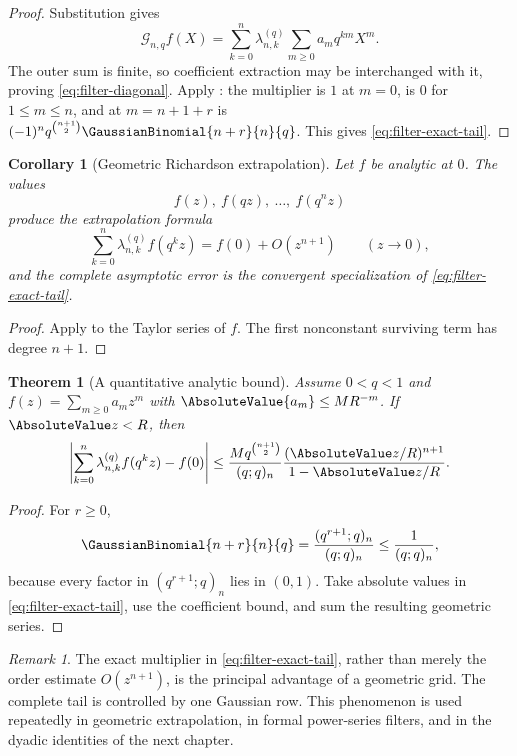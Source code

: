 \documentclass[11pt,a4paper,oneside,openany]{book}
\newtheorem{theorem}{Theorem}[chapter]
\newtheorem{corollary}[corollary]{Corollary}
\theoremstyle{definition}
\theoremstyle{remark}
\newtheorem{remark}[remark]{Remark}
\begin{document}
\begin{proof}
Substitution gives
\[
 \mathcal G_{n,q}f(X)
 =\sum_{k=0}^{n}\lambda_{n,k}^{(q)}
   \sum_{m\ge0}a_mq^{km}X^m.
\]
The outer sum is finite, so coefficient extraction may be interchanged with it, proving \eqref{eq:filter-diagonal}.  Apply : the multiplier is $1$ at $m=0$, is $0$ for $1\le m\le n$, and at $m=n+1+r$ is
$(-1)^nq^{\binom{n+1}{2}}\GaussianBinomial{n+r}{n}{q}$.  This gives \eqref{eq:filter-exact-tail}.
\end{proof}

\begin{corollary}[Geometric Richardson extrapolation]\label{cor:geometric-richardson}
Let $f$ be analytic at $0$.  The values
\[
 f(z),\ f(qz),\ \ldots,\ f(q^nz)
\]
produce the extrapolation formula
\[
 \sum_{k=0}^{n}\lambda_{n,k}^{(q)}f(q^kz)
 =f(0)+O(z^{n+1})
 \qquad(z\to0),
\]
and the complete asymptotic error is the convergent specialization of
\eqref{eq:filter-exact-tail}.
\end{corollary}

\begin{proof}
Apply  to the Taylor series of $f$.  The first nonconstant surviving term has degree $n+1$.
\end{proof}

\begin{theorem}[A quantitative analytic bound]\label{thm:geometric-filter-bound}
Assume $0<q<1$ and
$f(z)=\sum_{m\ge0}a_mz^m$ with
$\AbsoluteValue{a_m}\le M R^{-m}$.  If $\AbsoluteValue z<R$, then
\begin{equation}\label{eq:geometric-filter-bound}
 \left|\sum_{k=0}^{n}\lambda_{n,k}^{(q)}f(q^kz)-f(0)\right|
 \le
 \frac{M q^{\binom{n+1}{2}}}{(q;q)_n}
 \frac{(\AbsoluteValue z/R)^{n+1}}{1-\AbsoluteValue z/R}.
\end{equation}
\end{theorem}

\begin{proof}
For $r\ge0$,
\[
 \GaussianBinomial{n+r}{n}{q}
 =\frac{(q^{r+1};q)_n}{(q;q)_n}
 \le\frac1{(q;q)_n},
\]
because every factor in $(q^{r+1};q)_n$ lies in $(0,1)$.  Take absolute values in \eqref{eq:filter-exact-tail}, use the coefficient bound, and sum the resulting geometric series.
\end{proof}

\begin{remark}
The exact multiplier in \eqref{eq:filter-exact-tail}, rather than merely the order estimate $O(z^{n+1})$, is the principal advantage of a geometric grid.  The complete tail is controlled by one Gaussian row.  This phenomenon is used repeatedly in geometric extrapolation, in formal power-series filters, and in the dyadic identities of the next chapter.
\end{remark}
\end{document}

